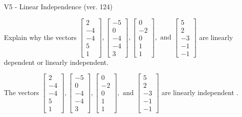 \begin{exercise}
  \begin{exerciseTitle}V5 - Linear Independence (ver. 124)\end{exerciseTitle}
  \begin{exerciseStatement}
    Explain why the vectors \(\left[\begin{array}{r}
2 \\
-4 \\
-4 \\
5 \\
1
\end{array}\right] , \left[\begin{array}{r}
-5 \\
0 \\
-4 \\
-4 \\
3
\end{array}\right] , \left[\begin{array}{r}
0 \\
-2 \\
0 \\
1 \\
1
\end{array}\right] , \text{ and } \left[\begin{array}{r}
5 \\
2 \\
-3 \\
-1 \\
-1
\end{array}\right]\) are linearly dependent or linearly independent.	


  \end{exerciseStatement}
  \begin{exerciseAnswer}
   The vectors \(\left[\begin{array}{r}
2 \\
-4 \\
-4 \\
5 \\
1
\end{array}\right] , \left[\begin{array}{r}
-5 \\
0 \\
-4 \\
-4 \\
3
\end{array}\right] , \left[\begin{array}{r}
0 \\
-2 \\
0 \\
1 \\
1
\end{array}\right] , \text{ and } \left[\begin{array}{r}
5 \\
2 \\
-3 \\
-1 \\
-1
\end{array}\right]\) are 
  	 linearly independent  .
  


  \end{exerciseAnswer}
\end{exercise}